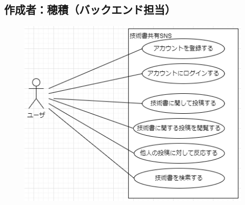 \documentclass[dvipdfmx]{jsarticle}
\begin{document}
    \subsection*{\rm{作成者：穂積（バックエンド担当）}}
        \begin{figure}[H]
            \begin{center}
                \includegraphics[scale=1.0,clip]{pictures/usecase.drawio_1.png}
            \end{center}
        \end{figure}
    \newpage
\end{document}
